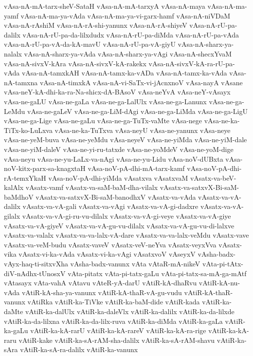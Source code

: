 {vAsa-nA-mA-tarx-sheV-SataH
vAsa-nA-mA-tarxyA
vAsa-nA-maya
vAsa-nA-ma-yamf
vAsa-nA-ma-ya-vAda
vAsa-nA-ma-ya-vi-garx-hamf
vAsa-nA-niVDaM
vAsa-nA-rAshiM
vAsa-nA-rA-shi-yanunx
vAsa-nA-rA-shiyeV
vAsa-nA-rU-pa-dalilx
vAsa-nA-rU-pa-da-lilxdudx
vAsa-nA-rU-pa-diMda
vAsa-nA-rU-pa-vAda
vAsa-nA-rU-pa-vA-da-kA-mavU
vAsa-nA-rU-pa-vA-giyU
vAsa-nA-sharx-ya-nalalx
vAsa-nA-sharx-ya-vAda
vAsa-nA-sharx-ya-vAgi
vAsa-nA-shecxYvaM
vAsa-nA-sivxV-kAra
vAsa-nA-sivxV-kA-rakekx
vAsa-nA-sivxV-kA-ra-rU-pa-vAda
vAsa-nA-tamxkAH
vAsa-nA-tamx-ka-vADa
vAsa-nA-tamx-ka-vAda
vAsa-nA-tamxna
vAsa-nA-timxkA
vAsa-nA-vi-SaTx-vi-jAcnxnoV
vAsa-nayA
vAsane
vAsa-neY-kA-dhi-ka-ra-Na-shicx-dA-BAsoV
vAsa-neYvA
vAsa-neY-vAsayx
vAsa-ne-gaLU
vAsa-ne-gaLa
vAsa-ne-ga-LalUlx
vAsa-ne-ga-Lanunx
vAsa-ne-ga-LeMdu
vAsa-ne-gaLeV
vAsa-ne-ga-LiM-dAgi
vAsa-ne-ga-LiMda
vAsa-ne-ga-LigU
vAsa-ne-ga-Lige
vAsa-ne-gaLu
vAsa-ne-ga-TuTx-vaMte
vAsa-nege
vAsa-ne-ka-TiTx-ko-LuLxva
vAsa-ne-ka-TuTxva
vAsa-neyU
vAsa-ne-yanunx
vAsa-neye
vAsa-ne-yeM-buva
vAsa-ne-yeMdu
vAsa-neyeV
vAsa-ne-yiMda
vAsa-ne-yiM-dale
vAsa-ne-yiM-daleV
vAsa-ne-yi-ru-tatxde
vAsa-ne-yoMdeV
vAsa-ne-yoM-dige
vAsa-neyu
vAsa-ne-yu-LaLx-va-nAgi
vAsa-ne-yu-Lidu
vAsa-noV-dUBxta
vAsa-noV-kitx-parx-sa-knagxtaH
vAsa-noV-pA-dhi-mA-tarx-kamf
vAsa-noV-pA-dhi-rA-temxYkaH
vAsa-noV-pA-dhi-yiMda
vAsatxva
vAsatxvaM
vAsatx-va-beV-kalAlx
vAsatx-vamf
vAsatx-va-saM-baM-dha-vilalx
vAsatx-va-satxvX-Bi-saM-baMdhoV
vAsatx-va-satxvX-Bi-saM-banodhxV
vAsatx-va-vAda
vAsatx-va-vA-dalilx
vAsatx-va-vA-gali
vAsatx-va-vAgi
vAsatx-va-vA-gi-dadxre
vAsatx-va-vA-gilalx
vAsatx-va-vA-gi-ru-vu-dilalx
vAsatx-va-vA-gi-veye
vAsatx-va-vA-giye
vAsatx-va-vA-giyeV
vAsatx-va-vA-gu-vu-dilalx
vAsatx-va-vA-gu-vu-di-lalxve
vAsatx-va-valalx
vAsatx-va-va-lalx-vA-dare
vAsatx-va-va-lalx-veMdu
vAsatx-vave
vAsatx-va-veM-budu
vAsatx-vaveV
vAsatx-veV-neYva
vAsatx-veyxVva
vAsatx-vika
vAsatx-vi-ka-vAda
vAsatx-vi-ka-vAgi
vAsatxvoV
vAseyxV
vAsha-badx-vAyx-haq-ti-sitxvXha
vAsha-badx-vanunx
vAta
vAtaR-mA-nikeV
vAta-pi-tAtx-diV-nAdhx-tUnosxV
vAta-pitatx
vAta-pi-tatx-gaLu
vAta-pi-tatx-sa-mA-ga-mAtf
vAtasayx
vAta-vahA
vAtavu
vAteR-yA-darU
vAtiR-kA-dhaRvu
vAtiR-kA-nu-vAda
vAtiR-kA-sha-ya-vanunx
vAtiR-kA-thaR-vA-gu-vudu
vAtiR-kA-thaR-vanunx
vAtiRka
vAtiR-ka-TiVke
vAtiR-ka-baM-dide
vAtiR-kada
vAtiR-ka-daMte
vAtiR-ka-dalUlx
vAtiR-ka-daleVlx
vAtiR-ka-dalilx
vAtiR-ka-da-lilxde
vAtiR-ka-da-lilxna
vAtiR-ka-da-lilx-ruva
vAtiR-ka-diMda
vAtiR-ka-gaLa
vAtiR-ka-gaLu
vAtiR-ka-kA-rarU
vAtiR-ka-kA-rareV
vAtiR-ka-kA-ra-rige
vAtiR-ka-kA-raru
vAtiR-kake
vAtiR-ka-sA-rAM-sha-dalilx
vAtiR-ka-sA-rAM-shavu
vAtiR-ka-sAra
vAtiR-ka-sA-ra-dalilx
vAtiR-ka-vanunx
}
